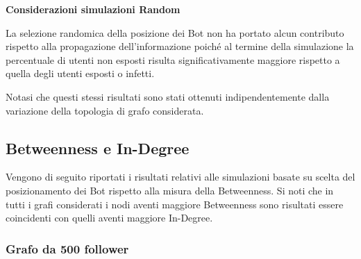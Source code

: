         \textbf{Considerazioni simulazioni Random} 
        
        La selezione randomica della posizione dei Bot non ha portato alcun contributo rispetto alla propagazione dell'informazione 
        poiché al termine della simulazione la percentuale di utenti non esposti risulta significativamente maggiore rispetto a quella degli utenti esposti o infetti.
        
        Notasi che questi stessi risultati sono stati ottenuti indipendentemente dalla variazione della topologia di grafo considerata.

    \subsection{Betweenness e In-Degree}
    Vengono di seguito riportati i risultati relativi alle simulazioni basate su scelta del posizionamento dei Bot rispetto alla misura della Betweenness. Si noti che in tutti i grafi considerati i nodi aventi maggiore Betweenness sono risultati essere coincidenti con quelli aventi maggiore In-Degree.
    
        \subsubsection{Grafo da 500 follower}
            

